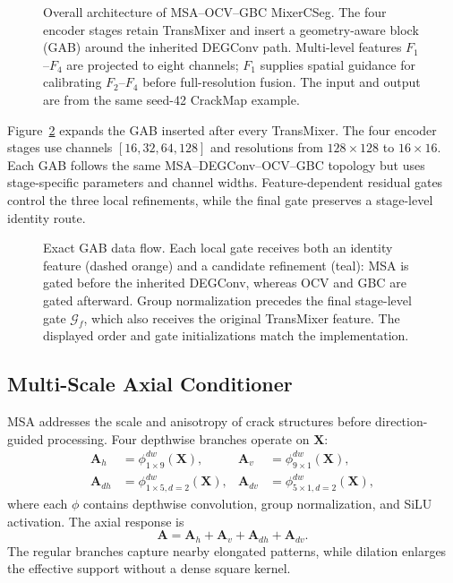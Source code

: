 \documentclass[preprint,12pt]{elsarticle}
\begin{document}
\begin{figure}[H]
\centering

\caption{Overall architecture of MSA--OCV--GBC MixerCSeg. The four encoder stages retain TransMixer and insert a geometry-aware block (GAB) around the inherited DEGConv path. Multi-level features $F_1$--$F_4$ are projected to eight channels; $F_1$ supplies spatial guidance for calibrating $F_2$--$F_4$ before full-resolution fusion. The input and output are from the same seed-42 CrackMap example.}
\label{fig:architecture}
\end{figure}

Figure~\ref{fig:gab_visual} expands the GAB inserted after every TransMixer. The four encoder stages use channels $[16,32,64,128]$ and resolutions from $128\times128$ to $16\times16$. Each GAB follows the same MSA--DEGConv--OCV--GBC topology but uses stage-specific parameters and channel widths. Feature-dependent residual gates control the three local refinements, while the final gate preserves a stage-level identity route.

\begin{figure}[H]
\centering

\caption{Exact GAB data flow. Each local gate receives both an identity feature (dashed orange) and a candidate refinement (teal): MSA is gated before the inherited DEGConv, whereas OCV and GBC are gated afterward. Group normalization precedes the final stage-level gate $\mathcal{G}_f$, which also receives the original TransMixer feature. The displayed order and gate initializations match the implementation.}
\label{fig:gab_visual}
\end{figure}

\subsection{Multi-Scale Axial Conditioner}
\label{sec:msa}

MSA addresses the scale and anisotropy of crack structures before direction-guided processing. Four depthwise branches operate on $\mathbf{X}$:
\begin{align}
\mathbf{A}_{h} &= \phi^{dw}_{1\times9}(\mathbf{X}), &
\mathbf{A}_{v} &= \phi^{dw}_{9\times1}(\mathbf{X}), \\
\mathbf{A}_{dh} &= \phi^{dw}_{1\times5,d=2}(\mathbf{X}), &
\mathbf{A}_{dv} &= \phi^{dw}_{5\times1,d=2}(\mathbf{X}),
\end{align}
where each $\phi$ contains depthwise convolution, group normalization, and SiLU activation. The axial response is
\begin{equation}
\mathbf{A}=\mathbf{A}_{h}+\mathbf{A}_{v}+\mathbf{A}_{dh}+\mathbf{A}_{dv}.
\end{equation}
The regular branches capture nearby elongated patterns, while dilation enlarges the effective support without a dense square kernel.
\end{document}
